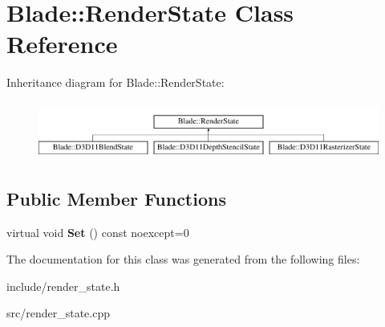 \hypertarget{class_blade_1_1_render_state}{}\section{Blade\+:\+:Render\+State Class Reference}
\label{class_blade_1_1_render_state}
Inheritance diagram for Blade\+:\+:Render\+State\+:\begin{figure}[H]
\begin{center}
\leavevmode
\includegraphics[height=1.904762cm]{class_blade_1_1_render_state}
\end{center}
\end{figure}
\subsection*{Public Member Functions}
\begin{DoxyCompactItemize}
\item 
\mbox{\label{class_blade_1_1_render_state_abac049a80872a9fdaaa773e72c841a11}} 
virtual void {\bfseries Set} () const noexcept=0
\end{DoxyCompactItemize}


The documentation for this class was generated from the following files\+:\begin{DoxyCompactItemize}
\item 
include/render\+\_\+state.\+h\item 
src/render\+\_\+state.\+cpp\end{DoxyCompactItemize}
